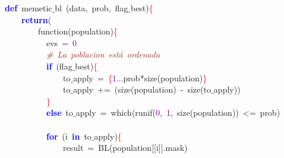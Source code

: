 \noindent
\mbox{}\textbf{\textcolor{Blue}{def}}\ memetic$\_$bl\ \textcolor{BrickRed}{(}data\textcolor{BrickRed}{,}\ prob\textcolor{BrickRed}{,}\ flag$\_$best\textcolor{BrickRed}{)}\textcolor{Red}{\{} \\
\mbox{}\ \ \ \ \textbf{\textcolor{Blue}{return}}\textcolor{BrickRed}{(} \\
\mbox{}\ \ \ \ \ \ \ \ function\textcolor{BrickRed}{(}population\textcolor{BrickRed}{)}\textcolor{Red}{\{} \\
\mbox{}\ \ \ \ \ \ \ \ \ \ evs\ \textcolor{BrickRed}{=}\ \textcolor{Purple}{0} \\
\mbox{}\ \ \ \ \ \ \ \ \ \ \textit{\textcolor{Brown}{\#\ La\ poblacion\ está\ ordenada}} \\
\mbox{}\ \ \ \ \ \ \ \ \ \ \textbf{\textcolor{Blue}{if}}\ \textcolor{BrickRed}{(}flag$\_$best\textcolor{BrickRed}{)}\textcolor{Red}{\{} \\
\mbox{}\ \ \ \ \ \ \ \ \ \ \ \ \ \ to$\_$apply\ \textcolor{BrickRed}{=}\ \textcolor{Red}{\{}\textcolor{Purple}{1}\textcolor{BrickRed}{...}prob\textcolor{BrickRed}{*}size\textcolor{BrickRed}{(}population\textcolor{BrickRed}{)}\textcolor{Red}{\}} \\
\mbox{}\ \ \ \ \ \ \ \ \ \ \ \ \ \ to$\_$apply\ \textcolor{BrickRed}{+=}\ \textcolor{BrickRed}{(}size\textcolor{BrickRed}{(}population\textcolor{BrickRed}{)}\ \textcolor{BrickRed}{-}\ size\textcolor{BrickRed}{(}to$\_$apply\textcolor{BrickRed}{))} \\
\mbox{}\ \ \ \ \ \ \ \ \ \ \textcolor{Red}{\}} \\
\mbox{}\ \ \ \ \ \ \ \ \ \ \textbf{\textcolor{Blue}{else}}\ to$\_$apply\ \textcolor{BrickRed}{=}\ which\textcolor{BrickRed}{(}runif\textcolor{BrickRed}{(}\textcolor{Purple}{0}\textcolor{BrickRed}{,}\ \textcolor{Purple}{1}\textcolor{BrickRed}{,}\ size\textcolor{BrickRed}{(}population\textcolor{BrickRed}{))}\ \textcolor{BrickRed}{\textless{}=}\ prob\textcolor{BrickRed}{)} \\
\mbox{} \\
\mbox{}\ \ \ \ \ \ \ \ \ \ \textbf{\textcolor{Blue}{for}}\ \textcolor{BrickRed}{(}i\ \textbf{\textcolor{Blue}{in}}\ to$\_$apply\textcolor{BrickRed}{)}\textcolor{Red}{\{} \\
\mbox{}\ \ \ \ \ \ \ \ \ \ \ \ \ \ result\ \textcolor{BrickRed}{=}\ BL\textcolor{BrickRed}{(}population\textcolor{BrickRed}{[[}i\textcolor{BrickRed}{]].}mask\textcolor{BrickRed}{)} \\
